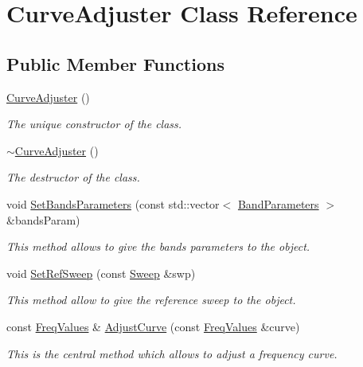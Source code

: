 \hypertarget{classCurveAdjuster}{}\section{Curve\+Adjuster Class Reference}
\label{classCurveAdjuster}
\subsection*{Public Member Functions}
\begin{DoxyCompactItemize}
\item 
\mbox{\label{classCurveAdjuster_a200e4c6f01360a11d7db776e1aeb3048}} 
\hyperlink{classCurveAdjuster_a200e4c6f01360a11d7db776e1aeb3048}{Curve\+Adjuster} ()
\begin{DoxyCompactList}\small\item\em The unique constructor of the class. \end{DoxyCompactList}\item 
\hyperlink{classCurveAdjuster_ae1939fed50d532e46bef47db5e3883c3}{$\sim$\+Curve\+Adjuster} ()
\begin{DoxyCompactList}\small\item\em The destructor of the class. \end{DoxyCompactList}\item 
void \hyperlink{classCurveAdjuster_a17080bae5109c5128caa4c214b856e19}{Set\+Bands\+Parameters} (const std\+::vector$<$ \hyperlink{structBandParameters}{Band\+Parameters} $>$ \&bands\+Param)
\begin{DoxyCompactList}\small\item\em This method allows to give the bands\textquotesingle{} parameters to the object. \end{DoxyCompactList}\item 
void \hyperlink{classCurveAdjuster_a5865916cf99ab2cad0a7a9bc2b4e1d56}{Set\+Ref\+Sweep} (const \hyperlink{structSweep}{Sweep} \&swp)
\begin{DoxyCompactList}\small\item\em This method allow to give the reference sweep to the object. \end{DoxyCompactList}\item 
const \hyperlink{structFreqValues}{Freq\+Values} \& \hyperlink{classCurveAdjuster_a3645614620645c7bfd86386576072d0a}{Adjust\+Curve} (const \hyperlink{structFreqValues}{Freq\+Values} \&curve)
\begin{DoxyCompactList}\small\item\em This is the central method which allows to adjust a frequency curve. \end{DoxyCompactList}\item 

\end{DoxyCompactItemize}
